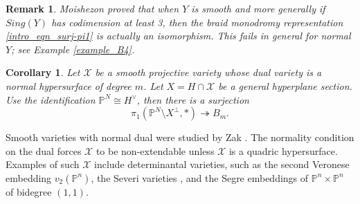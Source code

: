 \documentclass[12pt]{amsart}
\newtheorem{corollary}[theorem]{Corollary}
\newtheorem{remark}[theorem]{Remark}
\begin{document}
\begin{remark}\normalfont
    Moishezon \cite{Moishezon81} proved that when $Y$ is smooth and more generally if $Sing(Y)$ has codimension at least 3, then the braid monodromy representation \eqref{intro_eqn_surj-pi1} is actually an isomorphism. This fails in general for normal $Y$; see Example \ref{example_B4}.
\end{remark}
\begin{corollary}\label{intro_cor_normaldual}
   Let $\mathcal X$ be a smooth projective variety whose dual variety is a normal hypersurface of degree $m$. Let $X=H\cap \mathcal X$ be a general hyperplane section. Use the identification $\mathbb P^N\cong H^{\vee}$, then there is a surjection 
    $$\pi_1(\mathbb P^N\setminus X^{\perp} ,*)\twoheadrightarrow B_m.$$
\end{corollary}

Smooth varieties with normal dual were studied by Zak \cite{Zak_normaldual}. The normality condition on the dual forces $\mathcal X$ to be non-extendable unless $\mathcal X$ is a quadric hypersurface. Examples of such $\mathcal X$ include determinantal varieties, such as the second Veronese embedding $v_2(\mathbb P^n)$, the Severi varieties \cite{Zak_tangents&secants}, and the Segre embeddings of $\mathbb P^n\times \mathbb P^n$ of bidegree $(1,1)$.\\

\end{document}
